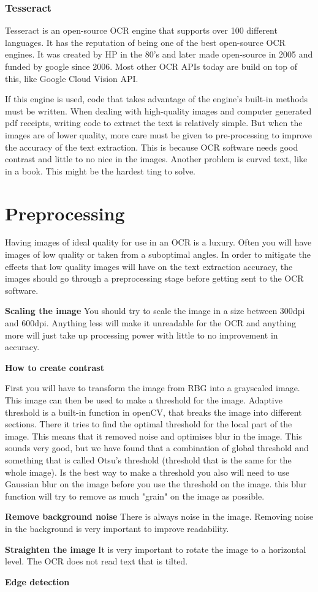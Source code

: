 \subsubsection{Tesseract}\label{subsubsec:Tesseract}
Tesseract is an open-source OCR engine that supports over 100 different languages.
It has the reputation of being one of the best open-source OCR engines.
It was created by HP in the 80's and later made open-source in 2005 and funded by google since 2006.
Most other OCR APIs today are build on top of this, like Google Cloud Vision API.

If this engine is used, code that takes advantage of the engine's built-in methods must be written.
When dealing with high-quality images and computer generated pdf receipts, writing code to extract the text is relatively simple.
But when the images are of lower quality, more care must be given to pre-processing to improve the accuracy of the text extraction.
This is because OCR software needs good contrast and little to no nice in the images.
Another problem is curved text, like in a book.
This might be the hardest ting to solve.

\section{Preprocessing}\label{sec:preprocessing}
Having images of ideal quality for use in an OCR is a luxury.
Often you will have images of low quality or taken from a suboptimal angles.
In order to mitigate the effects that low quality images will have on the text extraction accuracy, the images should go through a preprocessing stage before getting sent to the OCR software.


\textbf{Scaling the image}
You should try to scale the image in a size between 300dpi and 600dpi.
Anything less will make it unreadable for the OCR and anything more will just take up processing power with little to no improvement in accuracy.

\textbf{How to create contrast}


First you will have to transform the image from RBG into a grayscaled image.
This image can then be used to make a threshold for the image.
Adaptive threshold is a built-in function in openCV, that breaks the image into different sections.
There it tries to find the optimal threshold for the local part of the image.
This means that it removed noise and optimises blur in the image.
This sounds very good, but we have found that a combination of global threshold and something that is called Otsu's threshold (threshold that is the same for the whole image).
Is the best way to make a threshold you also will need to use Gaussian blur on the image before you use the threshold on the image.
this blur function will try to remove as much "grain" on the image as possible.

\textbf{Remove background noise}
There is always noise in the image.
Removing noise in the background is very important to improve readability.

\textbf{Straighten the image}
It is very important to rotate the image to a horizontal level.
The OCR does not read text that is tilted.

\textbf{Edge detection}